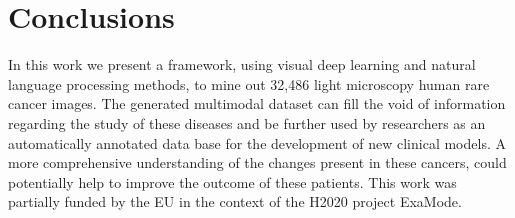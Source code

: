 \documentclass[]{spie}  %
\begin{document}
\section{Conclusions}
%
In this work we present a framework, using visual deep learning and natural language processing methods, to mine out 32,486 light microscopy human rare cancer images. 
The generated multimodal dataset can fill the void of information regarding the study of these diseases and be further used by researchers as an automatically annotated data base for the development of new clinical models.
A more comprehensive understanding of the changes present in these cancers, could potentially help to improve the outcome of these patients. 
%
\acknowledgments %
%
This work was partially funded by the EU in the context of the H2020 project ExaMode.
%
%
\end{document}
